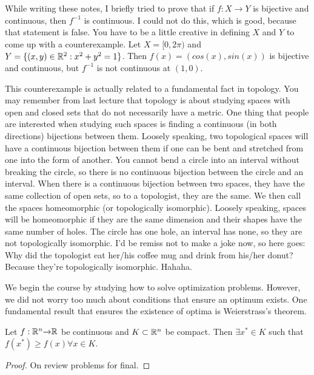 \begin{remark}
  While writing these notes, I briefly tried to prove that if $f:X \to
  Y$ is bijective and continuous, then $f^{-1}$ is continuous. I could
  not do this, which is good, because that statement is false. You have
  to be a little creative in defining $X$ and $Y$ to come up with a
  counterexample. Let $X = [0,2\pi)$ and $Y = \{(x,y) \in \mathbb{R}^2: x^2 +
  y^2 = 1 \}$. Then $f(x) = (cos(x), sin(x))$ is bijective and
  continuous, but $f^{-1}$ is not continuous at $(1,0)$. 
  
  This counterexample is actually related to a fundamental fact in
  topology. You may remember from last lecture that topology is about
  studying spaces with open and closed sets that do not necessarily
  have a metric. One thing that people are interested when studying
  such spaces is finding a continuous (in both directions) bijections
  between them. Loosely speaking, two topological spaces will have a
  continuous bijection between them if one can be bent and stretched
  from one into the form of another. You cannot bend a circle into an
  interval without breaking the circle, so there is no continuous
  bijection between the circle and an interval. When there is a
  continuous bijection between two spaces, they have the same
  collection of open sets, so to a topologist, they are the same. We
  then call the spaces homeomorphic (or topologically
  isomorphic). Loosely speaking, spaces will be homeomorphic if they
  are the same dimension and their shapes have the same number of
  holes.  The circle has one hole, an interval has none, so they are
  not topologically isomorphic. I'd be remiss not to make a joke now,
  so here goes: Why did the topologist eat her/his coffee mug and
  drink from his/her donut?  Because they're topologically
  isomorphic. Hahaha.
\end{remark}

We begin the course by studying how to solve optimization
problems. However, we did not worry too much about conditions that
ensure an optimum exists. One fundamental result that ensures the
existence of optima is Weierstrass's theorem.
\begin{theorem}[Weierstrass]
  Let $f:\mathbb{R}^n {\rightarrow} \mathbb{R}$ be continuous and $K \subset \mathbb{R}^n$ be
  compact. Then $\exists x^* \in K$ such that $f(x^*) \geq f(x)
  \forall x \in K$. 
\end{theorem}
\begin{proof}
  On review problems for final.
\end{proof}

